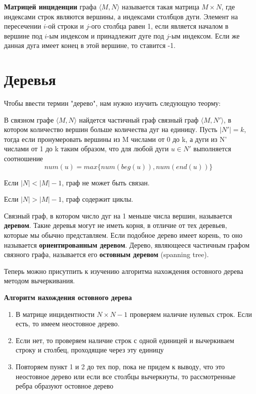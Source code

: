\textbf{Матрицей инциденции} графа $\langle M, N\rangle$ называется такая матрица $M \times N$, 
где индексами строк являются вершины, а индексами столбцов дуги. Элемент на пересечении $i$-ой строки и $j$-ого
столбца равен 1, если является началом в вершине под $i$-ым индексом и принадлежит дуге под $j$-ым индексом. Если же данная
дуга имеет конец в этой вершине, то ставится -1.

\section{Деревья}
Чтобы ввести термин "дерево", нам нужно изучить следующую теорму:
\begin{thm}
    В связном графе $\langle M, N \rangle$ найдется частичный граф связный граф
    $\langle M, N' \rangle$, в котором количество вершин больше количества дуг на единицу. Пусть $|N'| = k$, 
    тогда если пронумеровать вершины из M числами от 0 до k, а дуги из N' числами от 1 до k
    таким образом, что для любой дуги $u \in N'$ выполняется соотношение
    \begin{equation}
        num(u) = max\{num(beg(u)), num(end(u))\}
    \end{equation}
\end{thm}
\begin{sle}
    Если $|N| < |M| - 1$, граф не может быть связан.
\end{sle}
\begin{sle}
    Если $|N| > |M| - 1$, граф содержит циклы.
\end{sle}

Связный граф, в котором число дуг на 1 меньше числа вершин, называется
\textbf{деревом}. Такие деревья могут не иметь корня, в отличие от тех деревьев,
которые мы обычно представляем. Если подобное дерево имеет корень, то оно называется 
\textbf{ориентированным деревом}.
Дерево, являющееся частичным графом связного графа, называется его \textbf{остовным деревом} (spanning tree).

Теперь можно присутпить к изучению алгоритма нахождения остовного дерева методом вычеркивания.

\hspace{5mm}

\textbf{Алгоритм нахождения остовного дерева}
\begin{enumerate}
    \item В матрице инцидентности $N \times N-1$ проверяем наличие нулевых строк. 
    Если есть, то имеем неостовное дерево.
    \item Если нет, то проверяем наличие строк с одной единицей
    и вычеркиваем строку и столбец, проходящие через эту единицу
    \item Повторяем пункт 1 и 2 до тех пор, пока не придем к выводу, что это неостовное дерево или
    если все столбцы вычеркнуты, то рассмотренные ребра образуют остовное дерево
\end{enumerate}

